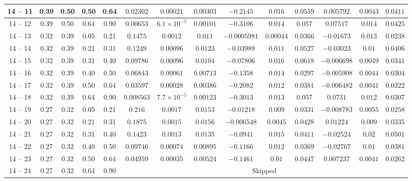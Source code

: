 \begin{longtable}{|*{14}{c|}}
\hline
14 -- 11 & 0.39 & 0.50 & 0.50 & 0.64 & $0.02302$ & $0.00021$ & $0.00303$ & $-0.2145$ & $0.016$ & $0.0559$ & $0.005792$ & $0.0043$ & $0.0411$ \\
\hline
14 -- 12 & 0.39 & 0.50 & 0.64 & 0.90 & $0.00653$ & $6.1\times 10^{-5}$ & $0.00101$ & $-0.3106$ & $0.014$ & $0.057$ & $0.07517$ & $0.014$ & $0.0425$ \\
\hline
14 -- 13 & 0.32 & 0.39 & 0.05 & 0.21 & $0.1475$ & $0.0012$ & $0.011$ & $-0.0005981$ & $0.00044$ & $0.0366$ & $-0.01673$ & $0.013$ & $0.0238$ \\
\hline
14 -- 14 & 0.32 & 0.39 & 0.21 & 0.31 & $0.1249$ & $0.00096$ & $0.0123$ & $-0.03989$ & $0.011$ & $0.0527$ & $-0.03023$ & $0.01$ & $0.0406$ \\
\hline
14 -- 15 & 0.32 & 0.39 & 0.31 & 0.40 & $0.09786$ & $0.00096$ & $0.0104$ & $-0.07806$ & $0.016$ & $0.0618$ & $-0.006698$ & $0.0049$ & $0.0341$ \\
\hline
14 -- 16 & 0.32 & 0.39 & 0.40 & 0.50 & $0.06843$ & $0.00061$ & $0.00713$ & $-0.1358$ & $0.014$ & $0.0297$ & $-0.005908$ & $0.0044$ & $0.0304$ \\
\hline
14 -- 17 & 0.32 & 0.39 & 0.50 & 0.64 & $0.03597$ & $0.00028$ & $0.00386$ & $-0.2082$ & $0.012$ & $0.0381$ & $-0.006482$ & $0.0041$ & $0.0322$ \\
\hline
14 -- 18 & 0.32 & 0.39 & 0.64 & 0.90 & $0.008563$ & $7.7\times 10^{-5}$ & $0.00123$ & $-0.3013$ & $0.013$ & $0.057$ & $0.0731$ & $0.012$ & $0.0307$ \\
\hline
14 -- 19 & 0.27 & 0.32 & 0.05 & 0.21 & $0.216$ & $0.0017$ & $0.0153$ & $-0.01218$ & $0.009$ & $0.0331$ & $-0.008783$ & $0.0055$ & $0.0258$ \\
\hline
14 -- 20 & 0.27 & 0.32 & 0.21 & 0.31 & $0.1875$ & $0.0015$ & $0.0156$ & $-0.006548$ & $0.0045$ & $0.0428$ & $0.01224$ & $0.009$ & $0.0335$ \\
\hline
14 -- 21 & 0.27 & 0.32 & 0.31 & 0.40 & $0.1423$ & $0.0013$ & $0.0135$ & $-0.0941$ & $0.015$ & $0.0411$ & $-0.02524$ & $0.02$ & $0.0501$ \\
\hline
14 -- 22 & 0.27 & 0.32 & 0.40 & 0.50 & $0.09746$ & $0.00074$ & $0.00895$ & $-0.1166$ & $0.012$ & $0.0369$ & $-0.02767$ & $0.01$ & $0.0381$ \\
\hline
14 -- 23 & 0.27 & 0.32 & 0.50 & 0.64 & $0.04959$ & $0.00035$ & $0.00524$ & $-0.1461$ & $0.01$ & $0.0447$ & $0.007237$ & $0.0041$ & $0.0262$ \\
\hline
14 -- 24 & 0.27 & 0.32 & 0.64 & 0.90 & \multicolumn{9}{c|}{Skipped} \\

\end{longtable}
